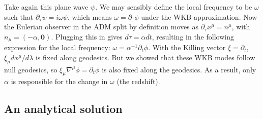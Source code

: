 \documentclass{article}
\begin{document}
\noindent
Take again this plane wave $\psi$.
We may sensibly define the local frequency to be $\omega$ such that $\partial_\tau\psi=i\omega\psi$.
which means $\omega=\partial_\tau\phi$ under the WKB approximation.
Now the Eulerian observer in the ADM split by definition moves as $\partial_\tau x^\mu=n^\mu$, with $n_\mu=(-\alpha,\mathbf0)$.
Plugging this in gives $d\tau=\alpha dt$, resulting in the following expression for the local frequency: $\omega=\alpha^{-1}\partial_t\phi$.
With the Killing vector $\xi=\partial_t$, $\xi_\mu dx^\mu/d\lambda$ is fixed along geodesics.
But we showed that these WKB modes follow null geodesics, so $\xi_\mu\nabla^\mu\phi=\partial_t\phi$ is also fixed along the geodesics.
As a result, only $\alpha$ is responsible for the change in $\omega$ (the redshift).

\subsection{An analytical solution}
\end{document}
